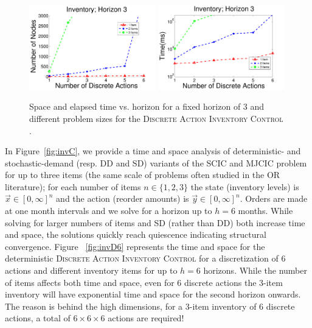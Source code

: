 \documentclass[twoside,11pt]{article}
\newcommand{\InventoryControl}{\textsc{Inventory Control }}
\begin{document}
\begin{figure}[tbp!]
\vspace{-2mm}
\centering
\includegraphics[width=0.49\textwidth]{Figures2/camdp/invH3Node.pdf}
\includegraphics[width=0.49\textwidth]{Figures2/camdp/invH3Time.pdf}
\vspace{-2mm}
\caption{%
Space and elapsed time vs. horizon for a fixed horizon of 3 and different problem sizes for the \textsc{Discrete Action} \InventoryControl. 
}
\label{fig:invH3}
\vspace{-2mm}
\end{figure}
In Figure~\ref{fig:invC}, we provide a time and space analysis of
deterministic- and stochastic-demand (resp. DD and SD) variants of the
SCIC and MJCIC problem for up to three items (the same scale of
problems often studied in the OR literature); for each number of items
$n \in \{ 1,2,3 \}$ the state (inventory levels) is $\vec{x} \in
[0,\infty]^n$ and the action (reorder amounts) is $\vec{y} \in
[0,\infty]^n$.  Orders are made at one month intervals and we solve
for a horizon up to $h=6$ months.  
While solving for larger numbers of
items and SD (rather than DD) both increase time and space, 
the solutions quickly reach quiescence indicating structural
convergence.
Figure ~\ref{fig:invD6} represents the time and space for the deterministic \textsc{Discrete Action} \InventoryControl for a discretization of 6 actions and different inventory items for up to $h=6$ horizons. While the number of items affects both time and space, even for 6 discrete actions the 3-item inventory will have exponential time and space for the second horizon onwards. The reason is behind the high dimensions, for a 3-item inventory of 6 discrete actions, a total of $6 \times 6 \times 6$ actions are required!
\end{document}
